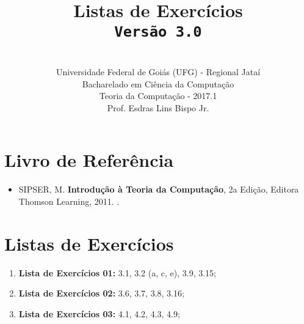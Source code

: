 \documentclass[12pt,a4paper,oneside]{article}
\author{\\Universidade Federal de Goiás (UFG) - Regional Jataí\\Bacharelado em Ciência da Computação \\Teoria da Computação - 2017.1 \\Prof. Esdras Lins Bispo Jr.}
\date{}
\title{
	\sc \huge Listas de Exercícios
	\\{\tt Versão 3.0}
}
\begin{document}
\maketitle

\section{Livro de Referência}
	\begin{itemize}
		\item SIPSER, M. {\bf Introdução à Teoria da Computação}, 2a Edição, Editora Thomson Learning, 2011. \color{blue}{\bf Código Bib.: [004 SIP/int]}.
	\end{itemize}
	
\section{Listas de Exercícios}

\begin{enumerate}

	\item[] {\bf Lista de Exercícios 01:} 3.1, 3.2 (a, c, e), 3.9, 3.15;
	\item[] {\bf Lista de Exercícios 02:} 3.6, 3.7, 3.8, 3.16;
	\item[] {\bf Lista de Exercícios 03:} 4.1, 4.2, 4.3, 4.9;
	
\end{enumerate}
\end{document}
